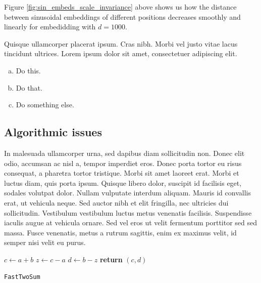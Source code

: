 \documentclass{article}
\begin{document}
Figure \ref{fig:sin_embeds_scale_invariance} above shows us how the distance between sinusoidal embeddings of different positions decreases smoothly and linearly for embedidding with $d = 1000$.

\begin{question}
	Quisque ullamcorper placerat ipsum. Cras nibh. Morbi vel justo vitae lacus tincidunt ultrices. Lorem ipsum dolor sit amet, consectetuer adipiscing elit.

	\begin{enumerate}[(a)]
		\item Do this.
		\item Do that.
		\item Do something else.
	\end{enumerate}
\end{question}
	

\subsection{Algorithmic issues}

In malesuada ullamcorper urna, sed dapibus diam sollicitudin non. Donec elit odio, accumsan ac nisl a, tempor imperdiet eros. Donec porta tortor eu risus consequat, a pharetra tortor tristique. Morbi sit amet laoreet erat. Morbi et luctus diam, quis porta ipsum. Quisque libero dolor, suscipit id facilisis eget, sodales volutpat dolor. Nullam vulputate interdum aliquam. Mauris id convallis erat, ut vehicula neque. Sed auctor nibh et elit fringilla, nec ultricies dui sollicitudin. Vestibulum vestibulum luctus metus venenatis facilisis. Suspendisse iaculis augue at vehicula ornare. Sed vel eros ut velit fermentum porttitor sed sed massa. Fusce venenatis, metus a rutrum sagittis, enim ex maximus velit, id semper nisi velit eu purus.

\begin{center}
	\begin{minipage}{0.5\linewidth} %
		\begin{algorithm}[H]
			\medskip
			$c \leftarrow a + b$ \;
			$z \leftarrow c - a$ \;
			$d \leftarrow b - z$ \;
			{\bf return} $(c,d)$ \;
			\caption{\texttt{FastTwoSum}} %
			\label{alg:fastTwoSum}   %
		\end{algorithm}
	\end{minipage}
\end{center}
\end{document}
